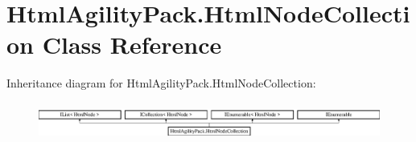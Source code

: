 \hypertarget{class_html_agility_pack_1_1_html_node_collection}{}\section{Html\+Agility\+Pack.\+Html\+Node\+Collection Class Reference}
\label{class_html_agility_pack_1_1_html_node_collection}
Inheritance diagram for Html\+Agility\+Pack.\+Html\+Node\+Collection\+:\begin{figure}[H]
\begin{center}
\leavevmode
\includegraphics[height=1.266968cm]{class_html_agility_pack_1_1_html_node_collection}
\end{center}
\end{figure}
